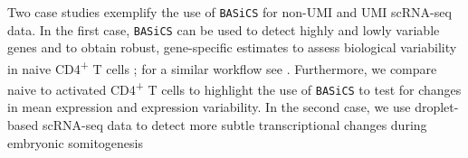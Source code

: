 \documentclass[9pt,a4paper,]{extarticle}
\begin{document}
Two case studies exemplify the use of \texttt{BASiCS} for non-UMI and UMI
scRNA-seq data. In the first case, \texttt{BASiCS} can be used to detect highly and
lowly variable genes and to obtain robust, gene-specific estimates to assess
biological variability in naive CD4\textsuperscript{+} T cells
\citep{Martinez-jimenez2017}; for a similar workflow see \citep{Kim2019}.
Furthermore, we compare naive to activated CD4\textsuperscript{+} T cells to highlight the use
of \texttt{BASiCS} to test for changes in mean expression and expression variability.
In the second case, we use droplet-based scRNA-seq data to detect more subtle
transcriptional changes during embryonic somitogenesis \citep{Ibarra-Soria2018}

\newpage

{\small}
\end{document}
